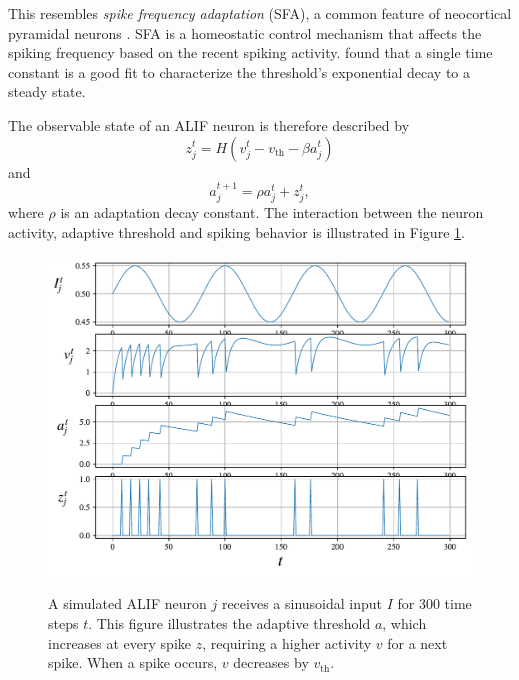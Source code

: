             This resembles \emph{spike frequency adaptation} (SFA), a common feature of neocortical pyramidal neurons \citep{benda2003universal}.
            SFA is a homeostatic control mechanism that affects the spiking frequency based on the recent spiking activity.
            \citet{ahmed1998estimates} found that a single time constant is a good fit to characterize the threshold's exponential decay to a steady state.



            The observable state of an ALIF neuron is therefore described by
            \begin{equation}\label{eq:alifZ}
            z^t_j = H\left(v_j^t - v_\text{th} - \beta a^t_j\right)
            \end{equation}
            and
            \begin{equation}\label{eq:alifA}
            a^{t+1}_j = \rho a^t_j + z^t_j,
            \end{equation}
            where $\rho$ is an adaptation decay constant.
            The interaction between the neuron activity, adaptive threshold and spiking behavior is illustrated in Figure \ref{fig:simplealif}.

            \begin{figure}[!ht]
                \centering
                \includegraphics[width=\linewidth]{gfx/simplealif}
                \label{fig:simplealif}
                \caption{A simulated ALIF neuron $j$ receives a sinusoidal input $I$ for 300 time steps $t$. This figure illustrates the adaptive threshold $a$, which increases at every spike $z$, requiring a higher activity $v$ for a next spike. When a spike occurs, $v$ decreases by $v_\text{th}$.}
            \end{figure}

